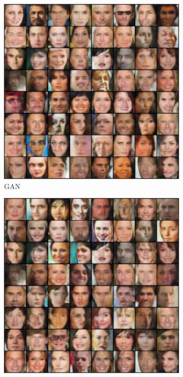 \begin{figure}[htbp]
    \centering
    \begin{subfigure}[b]{0.49\textwidth}
       \centering
       \includegraphics[width=\exfactor\textwidth]{figures/celeba/31_base_raw_base.jpg}
       \caption{GAN}
    \end{subfigure}
    \begin{subfigure}[b]{0.49\textwidth}
       \centering
       \includegraphics[width=\exfactor\textwidth]{figures/celeba/31_base_raw_reject.jpg}

\end{subfigure}
\end{figure}
